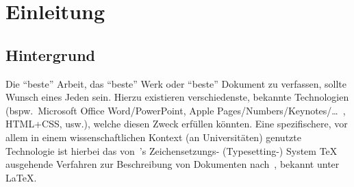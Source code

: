 \section{Einleitung}
\subsection{Hintergrund}\label{einleitung:hintergrund}
Die \enquote{beste} Arbeit, das \enquote{beste} Werk oder \enquote{beste} Dokument zu verfassen, sollte Wunsch eines Jeden sein. Hierzu existieren verschiedenste, bekannte Technologien (bspw.\ Microsoft Office Word/PowerPoint, Apple Pages/Numbers/Keynotes/\ldots~, HTML+CSS, usw.), welche diesen Zweck erfüllen könnten. Eine spezifischere, vor allem in einem wissenschaftlichen Kontext (an Universitäten) genutzte Technologie ist hierbei das von~\cite{texbook}'s Zeichensetzungs- (Typesetting-) System \TeX{} ausgehende Verfahren zur Beschreibung von Dokumenten nach~\cite{latexCompanion:leslieLamport}, bekannt unter \LaTeX{}.%

